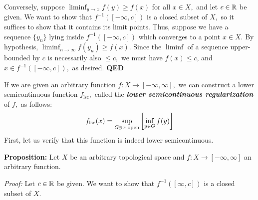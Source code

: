 \documentclass{article}
\begin{document}
Conversely, suppose $\liminf_{y \to x} f(y) \ge f(x)$ for all $x \in X,$ and let $c \in \mathbb{R}$ be given. We want to show that $f^{-1}([-\infty, c])$ is a closed subset of $X,$ so it suffices to show that it contains its limit points. Thus, suppose we have a sequence $\{y_n\}$ lying inside $f^{-1}([-\infty, c])$ which converges to a point $x \in X.$ By hypothesis, $\liminf_{n \to \infty} f(y_n) \ge f(x).$ Since the $\liminf$ of a sequence upper-bounded by $c$ is necessarily also $\le c,$ we must have $f(x) \le c$, and $x \in f^{-1}([-\infty, c]),$ as desired. \textbf{QED}%

If we are given an arbitrary function $f: X \to [-\infty, \infty],$ we can construct a lower semicontinuous function $f_\text{lsc},$ called the \textbf{\emph{lower semicontinuous regularization}} of $f,$ as follows:%
\noindent\noindent\[%
f_\text{lsc}(x) = \sup_{G \ni x \text{ open}} \qty[\inf_{y \in G} f(y)]
\]%
\noindent{}First, let us verify that this function is indeed lower semicontinuous.

\textbf{Proposition:} Let $X$ be an arbitrary topological space and $f: X \to [-\infty, \infty]$ an arbitrary function.%

\emph{Proof:} Let $c \in \mathbb{R}$ be given. We want to show that $f^{-1}([\infty, c])$ is a closed subset of $X.$%
\end{document}
